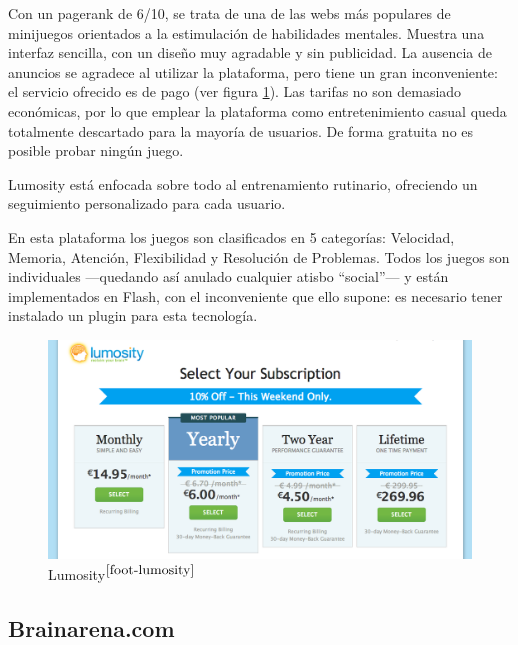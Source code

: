 Con un pagerank de 6/10, se trata de una de las webs más populares de minijuegos orientados a la estimulación de habilidades mentales. Muestra una interfaz sencilla, con un diseño muy agradable y sin publicidad. La ausencia de anuncios se agradece al utilizar la plataforma, pero tiene un gran inconveniente: el servicio ofrecido es de pago (ver figura \ref{fig::lumosity}). Las tarifas no son demasiado económicas, por lo que emplear la plataforma como entretenimiento casual queda totalmente descartado para la mayoría de usuarios. De forma gratuita no es posible probar ningún juego.
\addtocounter{footnote}{1}\footnotetext{\label{foot-minigameonline}{\tt http://www.minigameonline.net}}
Lumosity está enfocada sobre todo al entrenamiento rutinario, ofreciendo un seguimiento personalizado para cada usuario.

En esta plataforma los juegos son clasificados en 5 categorías: Velocidad, Memoria, Atención, Flexibilidad y Resolución de Problemas. Todos los juegos son individuales ---quedando así anulado cualquier atisbo ``social''--- y están implementados en Flash, con el inconveniente que ello supone: es necesario tener instalado un plugin para esta tecnología.

\begin{figure}[H]
  \begin{center}
    \includegraphics[width=\textwidth]{images/lumosity.png}
    \caption[Lumosity]{Lumosity$^{\ref{foot-lumosity}}$}
    \label{fig::lumosity}
  \end{center}
\end{figure}
\addtocounter{footnote}{1}\footnotetext{\label{foot-lumosity}{\tt http://www.lumosity.com}}



\subsection*{Brainarena.com}

